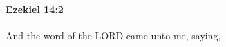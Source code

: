 
		\paragraph{Ezekiel 14:2} %
			\label{EZEKIEL-14-2}

			And the word of the LORD came unto me, saying,


